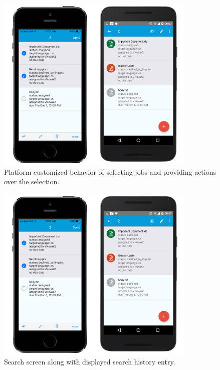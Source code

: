 \begin{figure}[]
	\includegraphics[width=0.85\textwidth]{pics/screenshots/projs}
	\caption{Platform-customized behavior of selecting jobs and providing actions over the selection.}
	\label{jobList}
\end{figure}


\begin{figure}[]
	\includegraphics[width=0.85\textwidth]{pics/screenshots/projs}
	\caption{Search screen along with displayed search history entry.}
	\label{search}
\end{figure}


